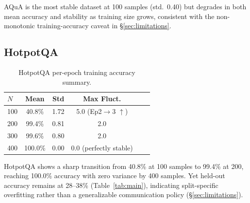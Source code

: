 \documentclass[11pt]{article}
\begin{document}
AQuA is the most stable dataset at 100 samples (std.\ 0.40) but degrades in
both mean accuracy and stability as training size grows, consistent with the
non-monotonic training-accuracy caveat in \S\ref{sec:limitations}.

\subsection{HotpotQA}

\begin{table}[H]
\centering
\small
\begin{tabular}{lccccc}
\toprule
$N$ & Mean & Std & Max Fluct. \\
\midrule
100 & 40.8\%  & 1.72 & 5.0 (Ep2$\to$3 $\uparrow$) \\
200 & 99.4\%  & 0.81 & 2.0 \\
300 & 99.6\%  & 0.80 & 2.0 \\
400 & 100.0\% & 0.00 & 0.0 (perfectly stable) \\
\bottomrule
\end{tabular}
\caption{HotpotQA per-epoch training accuracy summary.}
\label{tab:epoch-hotpot}
\end{table}

HotpotQA shows a sharp transition from 40.8\% at 100 samples to 99.4\% at
200, reaching 100.0\% accuracy with zero variance by 400 samples. Yet
held-out accuracy remains at 28--38\% (Table~\ref{tab:main}), indicating
split-specific overfitting rather than a generalizable communication policy
(\S\ref{sec:limitations}).
\end{document}
